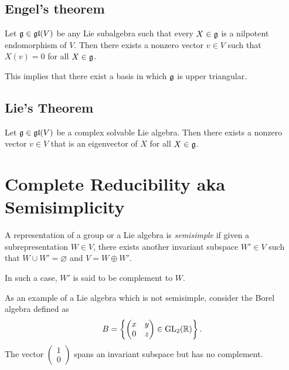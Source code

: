 \subsection{Engel's theorem}
\label{sub:engel_s_theorem}

\begin{theorem}
    Let $\mathfrak{g}\in \mathfrak{gl}(V)$ be any Lie subalgebra such that every $X\in \mathfrak{g}$ is a nilpotent endomorphism of $V$. Then there exists a nonzero vector $v\in V$ such that $X(v)=0$ for all $X\in\mathfrak{g}$.
\end{theorem}
\begin{corollary}
    
\end{corollary}
    This implies that there exist a basis in which $\mathfrak{g}$ is upper triangular.

\subsection{Lie's Theorem}
\label{sub:lie_s_theorem}
\begin{theorem}
    Let  $\mathfrak{g}\in\mathfrak{gl}(V)$ be a complex solvable Lie algebra. Then there exists a nonzero vector $v\in V$ that is an eigenvector of $X$ for all $X\in \mathfrak{g}$.
\end{theorem}

\section{Complete Reducibility aka Semisimplicity}
\label{sec:complete_reducibility_aka_semisimplicity}


\begin{definition}[Semisimplicity]
    A representation of a group or a Lie algebra is \emph{semisimple} if given a subrepresentation $W\in V$, there exists another invariant subspace $W'\in V$ such that $W\cup W'=\varnothing$ and $V=W\oplus W'$. 

In such a case, $W'$ is said to be complement to $W$.
\end{definition} 


\begin{insight}
    As an example of a Lie algebra which is not semisimple, consider the Borel algebra defined as
    \begin{align}
        B= \left\{ \begin{pmatrix} x & y \\ 0 & z \end{pmatrix} \in \operatorname{GL}_2(\mathbb{R})\right\} .
    \end{align}
    The vector $ \begin{pmatrix} 1 \\ 0 \end{pmatrix}$ spans an invariant subspace but has no complement.
\end{insight}


